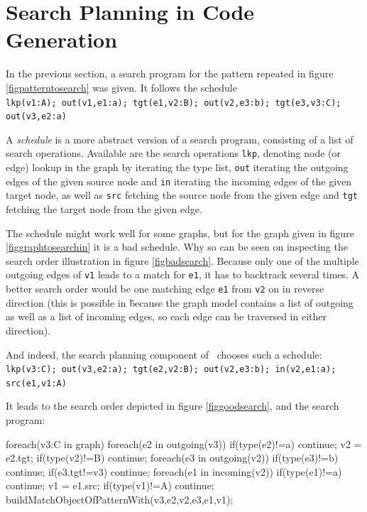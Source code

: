\section{Search Planning in Code Generation}
\label{searchplanning}

In the previous section, a search program for the pattern repeated in figure \ref{figpatterntosearch} was given.
It follows the schedule\\
\texttt{lkp(v1:A); out(v1,e1:a); tgt(e1,v2:B); out(v2,e3:b); tgt(e3,v3:C); out(v3,e2:a)}

A \emph{schedule} is a more abstract version of a search program, consisting of a list of search operations.
Available are the search operations \texttt{lkp}, denoting node (or edge) lookup in the graph by iterating the type list, 
\texttt{out} iterating the outgoing edges of the given source node and \texttt{in} iterating the incoming edges of the given target node,
as well as \texttt{src} fetching the source node from the given edge and \texttt{tgt} fetching the target node from the given edge.

The schedule might work well for some graphs, but for the graph given in figure \ref{figgraphtosearchin} it is a bad schedule.
Why so can be seen on inspecting the search order illustration in figure \ref{figbadsearch}.
Because only one of the multiple outgoing edges of \texttt{v1} leads to a match for \texttt{e1}, it has to backtrack several times.
A better search order would be one matching edge \texttt{e1} from \texttt{v2} on in reverse direction 
(this is possible in \GrG\~because the graph model contains a list of outgoing as well as a list of incoming edges, so each edge can be traversed in either direction).

And indeed, the search planning component of \GrG~chooses such a schedule:\\
\texttt{lkp(v3:C); out(v3,e2:a); tgt(e2,v2:B); out(v2,e3:b); in(v2,e1:a); src(e1,v1:A)}

It leads to the search order depicted in figure \ref{figgoodsearch}, and the search program:

\begin{csharp}
foreach(v3:C in graph) {
	foreach(e2 in outgoing(v3)) {
		if(type(e2)!=a) continue;
		v2 = e2.tgt;
		if(type(v2)!=B) continue;
		foreach(e3 in outgoing(v2)) {
			if(type(e3)!=b) continue;
			if(e3.tgt!=v3) continue;
				foreach(e1 in incoming(v2)) {
				if(type(e1)!=a) continue;
				v1 = e1.src;
				if(type(v1)!=A) continue;
				buildMatchObjectOfPatternWith(v3,e2,v2,e3,e1,v1);
			} 
		}
	}
}
\end{csharp}

